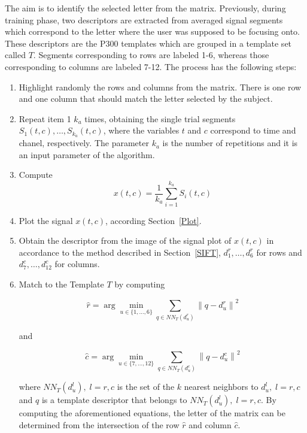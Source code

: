 \documentclass[entropy,article,submit,moreauthors,pdftex,10pt,a4paper]{mdpi}
\begin{document}
The aim is to identify the selected letter from the matrix. Previously, during training phase, two descriptors are extracted from averaged signal segments which correspond to the letter where the user was supposed to be focusing onto.  These descriptors are the P300 templates which are grouped in a template set called $ T $.  Segments corresponding to rows are labeled 1-6, whereas those corresponding to columns are labeled 7-12.  The process has the following steps:


\begin{enumerate}
\item Highlight randomly the rows and columns from the matrix.  There is one row and one column that should match the letter selected by the subject.
\item Repeat item 1 $k_a$ times, obtaining the single trial segments $S_1(t,c),\dots,S_{k_a}(t,c)$, where the variables $t$ and $c$ correspond to time and chanel, respectively. The parameter $k_a$ is the number of repetitions and it is an input parameter of the algorithm.
\item Compute  
\begin{equation}
x(t,c)= \frac{1}{k_a}\sum_{i=1}^{k_a}S_i(t,c)
\label{averaging}
\end{equation}  

\item Plot the signal $x(t,c)$, according Section~\ref{Plot}.

\item Obtain the descriptor from the image of the signal plot of $x(t,c)$ in accordance to the method described in Section~\ref{SIFT}, $ d^r_1, \dots,  d^r_6 $ for rows and  $ d^c_7, \dots,  d^c_{12} $ for columns. 


\item Match to the Template $T$ by computing  

\begin{equation}
\hat{r} = \arg \min_{u \in \{1,\dots,6\}} \sum_{q \in NN_T(d^r_u)}^{} \left\lVert q -  d^r_u \right\rVert ^2
\label{eq:multiclassificationrow}
\end{equation}

\noindent and

\begin{equation}
\hat{c} = \arg \min_{u \in \{7,\dots,12\}} \sum_{q \in NN_T(d^c_u)}^{} \left\lVert q -  d^c_u \right\rVert ^2
\label{eq:multiclassificationcol}
\end{equation}

where $NN_T(d^l_u), \;l=r,c$ is the set of the $k$ nearest neighbors to $d^l_u, \;l=r,c$ and $q$ is a template descriptor that belongs to $NN_T(d^l_u), \;l=r,c$.  By computing the aforementioned equations, the letter of the matrix can be determined from the intersection of the row $ \hat{r} $ and column $ \hat{c} $. 


\end{enumerate}
\end{document}
